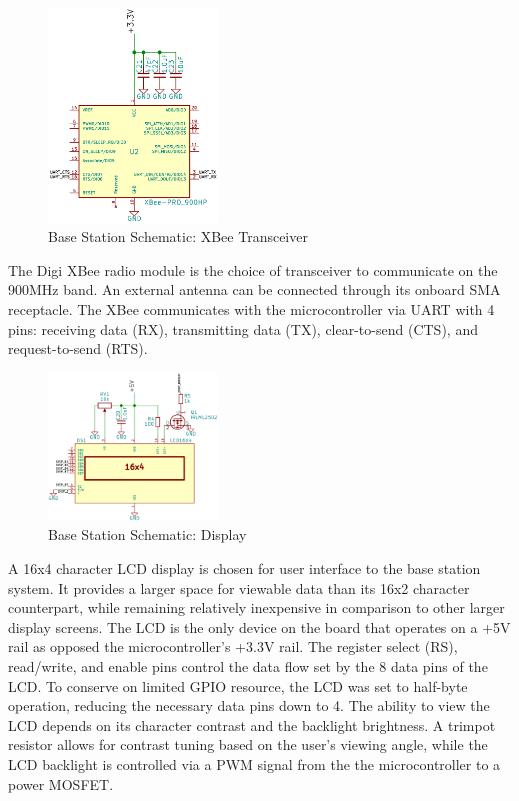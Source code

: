 \documentclass[journal,compsoc]{IEEEtran}
\begin{document}
\begin{figure}[ht] 	%
\centering
\includegraphics[width=0.4\textwidth]{base-schematic-xbee.png}
\caption{ \space Base Station Schematic: XBee Transceiver}
\label{base-sch-xbee}
\end{figure}

The Digi XBee radio module is the choice of transceiver to communicate on the 900MHz band. An external antenna can be connected through its onboard SMA receptacle. The XBee communicates with the microcontroller via UART with 4 pins: receiving data (RX), transmitting data (TX), clear-to-send (CTS), and request-to-send (RTS).

\begin{figure}[ht] 	%
\centering
\includegraphics[width=0.4\textwidth]{base-schematic-lcd.png}
\caption{ \space Base Station Schematic: Display}
\label{base-sch-lcd}
\end{figure}

A 16x4 character LCD display is chosen for user interface to the base station system. It provides a larger space for viewable data than its 16x2 character counterpart, while remaining relatively inexpensive in comparison to other larger display screens. The LCD is the only device on the board that operates on a +5V rail as opposed the microcontroller's +3.3V rail. The register select (RS), read/write, and enable pins control the data flow set by the 8 data pins of the LCD. To conserve on limited GPIO resource, the LCD was set to half-byte operation, reducing the necessary data pins down to 4. The ability to view the LCD depends on its character contrast and the backlight brightness. A trimpot resistor allows for contrast tuning based on the user's viewing angle, while the LCD backlight is controlled via a PWM signal from the the microcontroller to a power MOSFET.
\end{document}
